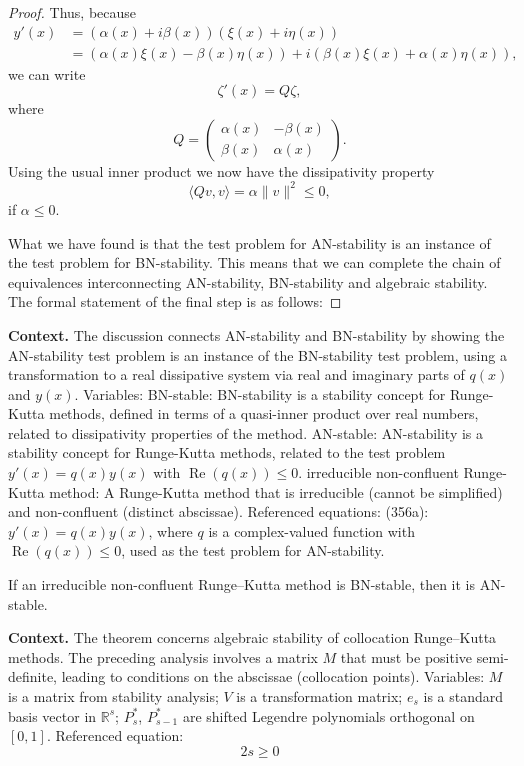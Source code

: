 \begin{proof}
Thus, because
\begin{align*}
y'(x) &= (\alpha(x) + i\beta(x))(\xi(x) + i\eta(x)) \\
&= (\alpha(x)\xi(x) - \beta(x)\eta(x)) + i(\beta(x)\xi(x) + \alpha(x)\eta(x)),
\end{align*}
we can write
\[
\zeta'(x) = Q\zeta,
\]
where
\[
Q = \begin{pmatrix}
\alpha(x) & -\beta(x) \\
\beta(x) & \alpha(x)
\end{pmatrix}.
\]
Using the usual inner product we now have the dissipativity property
\[
\langle Qv, v \rangle = \alpha \| v \|^2 \leq 0,
\]
if $\alpha \leq 0$.

What we have found is that the test problem for AN-stability is an instance of the test problem for BN-stability. This means that we can complete the chain of equivalences interconnecting AN-stability, BN-stability and algebraic stability. The formal statement of the final step is as follows:
\end{proof}

\noindent\textbf{Context.}
The discussion connects AN-stability and BN-stability by showing the AN-stability test problem is an instance of the BN-stability test problem, using a transformation to a real dissipative system via real and imaginary parts of $q(x)$ and $y(x)$. Variables: BN-stable: BN-stability is a stability concept for Runge-Kutta methods, defined in terms of a quasi-inner product over real numbers, related to dissipativity properties of the method. AN-stable: AN-stability is a stability concept for Runge-Kutta methods, related to the test problem $y'(x) = q(x)y(x)$ with $\operatorname{Re}(q(x)) \leq 0$. irreducible non-confluent Runge-Kutta method: A Runge-Kutta method that is irreducible (cannot be simplified) and non-confluent (distinct abscissae). Referenced equations: (356a): $y'(x) = q(x)y(x)$, where $q$ is a complex-valued function with $\operatorname{Re}(q(x)) \leq 0$, used as the test problem for AN-stability.

\begin{theorem}

  \label{thm:357D}
If an irreducible non-confluent Runge--Kutta method is BN-stable, then it is AN-stable.
\end{theorem}

\noindent\textbf{Context.}
The theorem concerns algebraic stability of collocation Runge--Kutta methods. The preceding analysis involves a matrix $M$ that must be positive semi-definite, leading to conditions on the abscissae (collocation points). Variables: $M$ is a matrix from stability analysis; $V$ is a transformation matrix; $e_s$ is a standard basis vector in $\mathbb{R}^s$; $P_s^*$, $P_{s-1}^*$ are shifted Legendre polynomials orthogonal on $[0,1]$. Referenced equation:
\begin{equation}
2s \ge 0 \tag{358a}
\end{equation}

